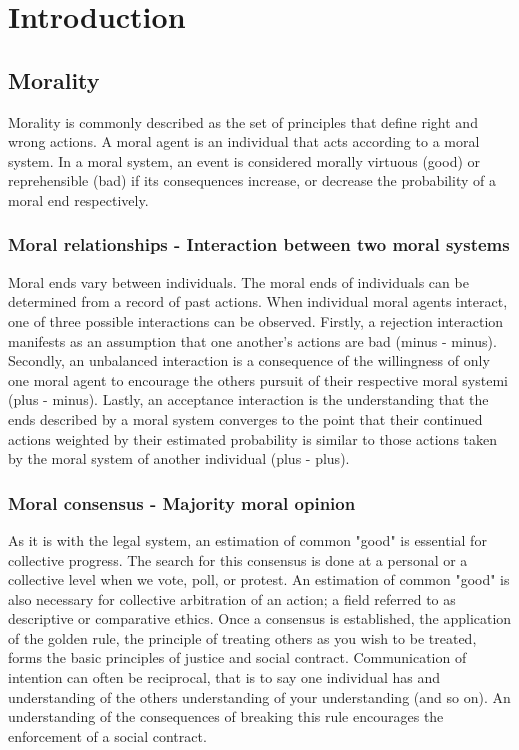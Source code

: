 \chapter{Introduction}
\section{Morality}
Morality is commonly described as the set of principles that define right and wrong actions.
A moral agent is an individual that acts according to a moral system.
In a moral system, an event is considered morally virtuous (good) or reprehensible (bad) if its consequences increase, or decrease the probability of a moral end respectively.

\subsection{Moral relationships - Interaction between two moral systems}
Moral ends vary between individuals.
The moral ends of individuals can be determined from a record of past actions.
When individual moral agents interact, one of three possible interactions can be observed.
Firstly, a rejection interaction manifests as an assumption that one another's actions are bad (minus - minus). 
Secondly, an unbalanced interaction is a consequence of the willingness of only one moral agent to encourage the others pursuit of their respective moral systemi (plus - minus).
Lastly, an acceptance interaction is the understanding that the ends described by a moral system converges to the point that their continued actions weighted by their estimated probability is similar to those actions taken by the moral system of another individual (plus - plus).

\subsection{Moral consensus - Majority moral opinion}
As it is with the legal system, an estimation of common "good" is essential for collective progress.
The search for this consensus is done at a personal or a collective level when we vote, poll, or protest. 
An estimation of common "good" is also necessary for collective arbitration of an action; a field referred to as descriptive or comparative ethics.
Once a consensus is established, the application of the golden rule, the principle of treating others as you wish to be treated, forms the basic principles of justice and social contract.
Communication of intention can often be reciprocal, that is to say one individual has and understanding of the others understanding of your understanding (and so on).
An understanding of the consequences of breaking this rule encourages the enforcement of a social contract.

